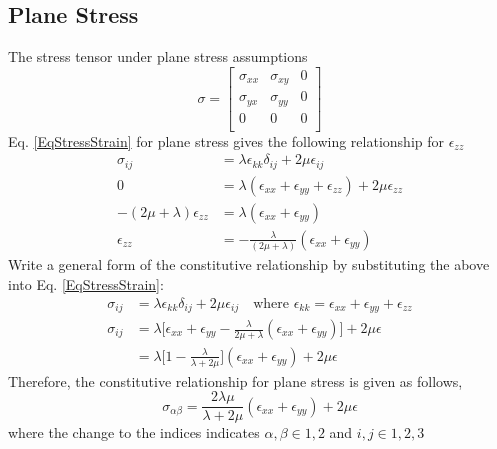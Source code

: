 \documentclass[12pt,3p]{article}
\begin{document}
\subsection{Plane Stress}
The stress tensor under plane stress assumptions
\begin{equation*}
\sigma = 
\begin{bmatrix}
\sigma_{xx} & \sigma_{xy} & 0 \\
\sigma_{yx} & \sigma_{yy} & 0 \\
0 & 0 & 0 \\
\end{bmatrix}
\end{equation*}
Eq. \ref{EqStressStrain} for plane stress gives the following relationship for $\epsilon_{zz}$
\begin{align*}
\sigma_{ij} &= \lambda \epsilon_{kk} \delta_{ij} + 2 \mu \epsilon_{ij} \\
0 &= \lambda (\epsilon_{xx} + \epsilon_{yy} + \epsilon_{zz}) + 2 \mu \epsilon_{zz} \\
- (2 \mu + \lambda) \epsilon_{zz} &= \lambda (\epsilon_{xx} + \epsilon_{yy}) \\
\epsilon_{zz} &= -\frac{\lambda}{(2 \mu + \lambda)} (\epsilon_{xx} + \epsilon_{yy})
\end{align*}
Write a general form of the constitutive relationship by substituting the above into Eq. \ref{EqStressStrain}: 
\begin{align*}
\sigma_{ij} &= \lambda \epsilon_{kk} \delta_{ij} + 2 \mu \epsilon_{ij} \quad \text{where } \epsilon_{kk} = \epsilon_{xx} + \epsilon_{yy} + \epsilon_{zz} \\
\sigma_{ij} &= \lambda \bigg[ \epsilon_{xx} + \epsilon_{yy} - \frac{\lambda}{2 \mu + \lambda} (\epsilon_{xx} + \epsilon_{yy}) \bigg]  + 2 \mu \epsilon \\
&= \lambda \big[ 1 - \frac{\lambda}{\lambda + 2 \mu } \big] (\epsilon_{xx} + \epsilon_{yy} ) + 2 \mu \epsilon 
\end{align*}
Therefore, the constitutive relationship for plane stress is given as follows, 
\begin{equation}\label{EqPlaneStress}
\sigma_{\alpha \beta} = \frac{2 \lambda \mu}{\lambda + 2 \mu } (\epsilon_{xx} + \epsilon_{yy} ) + 2 \mu \epsilon 
\end{equation}
where the change to the indices indicates $\alpha, \beta \in 1, 2$ and $i, j \in 1, 2, 3$
\end{document}

